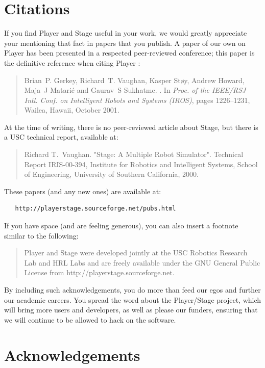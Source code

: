 \documentclass[11pt,twoside]{report}
\begin{document}
\section{Citations}
If you find Player and Stage useful in your work, we would greatly
appreciate your mentioning that fact in papers that you publish.  A
paper of our own on Player has been presented in a respected
peer-reviewed conference; this paper is the definitive reference when
citing Player \cite{GerkeyVaughan01a}:
\begin{quote}
Brian~P. Gerkey, Richard~T. Vaughan, Kasper St\o{}y, Andrew Howard,
Maja~J Matari\'c and Gaurav~S Sukhatme.
.
\newblock In {\em Proc. of the IEEE/RSJ Intl. Conf. on Intelligent Robots and
  Systems (IROS)}, pages 1226--1231, Wailea, Hawaii, October 2001.
\end{quote}

At the time of writing, there is no peer-reviewed article about Stage,
but there is a USC technical report, available at:

\begin{quote}
Richard T.~Vaughan. "Stage: A Multiple Robot Simulator". Technical Report IRIS-00-394, Institute for Robotics and Intelligent Systems, School of Engineering, University of Southern California, 2000.
\end{quote}

These papers (and any new ones) are available at: 

\begin{verbatim}
   http://playerstage.sourceforge.net/pubs.html
\end{verbatim}

If you have space (and are feeling generous), you can also insert a footnote
similar to the following:
\begin{quote}
Player and Stage were developed jointly at the USC Robotics Research
Lab and HRL Labs and are freely available under the GNU General Public
License from http://playerstage.sourceforge.net.
\end{quote}
By including such acknowledgements, you do more than feed our egos and
further our academic careers.  You spread the word about the
Player/Stage project, which will bring more users and developers, as
well as please our funders, ensuring that we will continue to be
allowed to hack on the software.

  \section{Acknowledgements}
\end{document}
